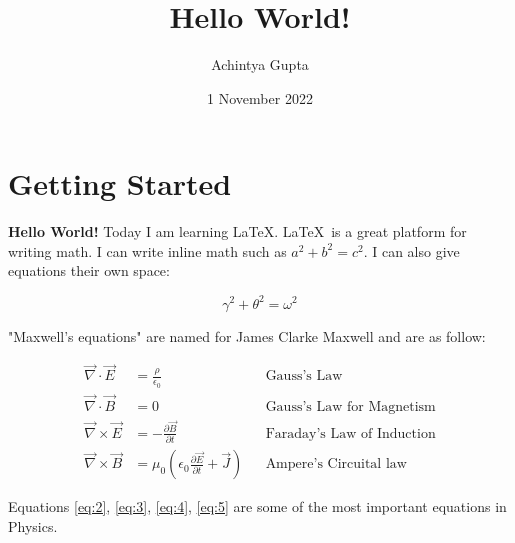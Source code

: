 \documentclass[12pt]{article}
\title{Hello World!}
\author{Achintya Gupta}
\date{1 November 2022}
\begin{document}
\maketitle

\section{Getting Started}
\textbf{Hello World!} Today I am learning \LaTeX. \LaTeX\ is a great platform for writing math. I can write inline math such as $a^2 + b^2 = c^2$. I can also give equations their own space: 

\begin{equation}
  \gamma^2 + \theta^2 = \omega^2  
\end{equation}

"Maxwell's equations" are named for James Clarke Maxwell and are as follow:

\begin{align*}
\vec\nabla\cdot\vec{E} &= \frac{\rho}{\epsilon_0} & &\textrm{Gauss's Law}\label{eq:2}\tag{2}  \\
\vec\nabla\cdot\vec{B} &= 0& &\textrm{Gauss's Law for Magnetism}\label{eq:3}\tag{3}\\
\vec\nabla \times \vec{E} &= -\frac{\partial\vec{B}}{\partial t} & &\textrm{Faraday's Law of Induction}\label{eq:4}\tag{4}\\
\vec\nabla \times \vec{B} &= \mu_0\left( \epsilon_0\frac{\partial\vec{E}}{\partial t} + \vec{J} \right) & &\textrm{Ampere's Circuital law}\label{eq:5}\tag{5}
\end{align*}

Equations \ref{eq:2}, \ref{eq:3}, \ref{eq:4}, \ref{eq:5} are some of the most important equations in Physics.
\end{document}

